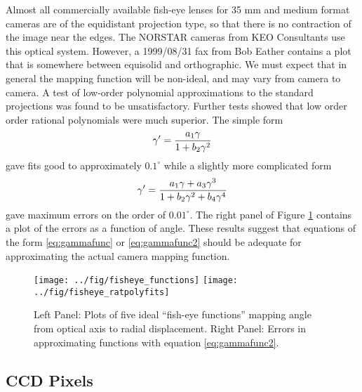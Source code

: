\documentclass[11pt,twoside]{article}   %
\begin{document}
Almost all commercially available fish-eye lenses for 35 mm and
medium format cameras are of the equidistant projection type, so
that there is no contraction of the image near the edges.  The
NORSTAR cameras from KEO Consultants use this optical system.
However, a 1999/08/31 fax from Bob Eather contains a plot that is
somewhere between equisolid and orthographic.  We must expect that
in general the mapping function will be non-ideal, and may vary
from camera to camera.  A test of low-order polynomial
approximations to the standard projections was found to be
unsatisfactory. Further tests showed that low order order rational
polynomials were much superior.  The simple form
 \begin{equation}
   \gamma^\prime = {{a_1 \gamma}\over{1+b_2 \gamma^2 }}
  \label{eq:gammafunc}
 \end{equation}
gave fits good to approximately $0.1^\circ$ while a slightly more
complicated form
 \begin{equation}
   \gamma^\prime = {{a_1 \gamma + a_3 \gamma^3}\over{1+b_2 \gamma^2 + b_4 \gamma^4}}
   \label{eq:gammafunc2}
 \end{equation}
gave maximum errors on the order of $0.01^\circ$.  The right panel
of Figure \ref{fig:fisheyefunctions} contains a plot of the errors
as a function of angle. These results suggest that equations of
the form \ref{eq:gammafunc} or \ref{eq:gammafunc2} should be
adequate for approximating the actual camera mapping function.

\begin{figure}
 \centering
  \texttt{[image: ../fig/fisheye\_functions]}
  \texttt{[image: ../fig/fisheye\_ratpolyfits]}
    \caption[Fish-eye functions]
   {Left Panel: Plots of five ideal ``fish-eye functions'' mapping angle from optical
     axis to radial displacement.  Right Panel: Errors in
     approximating functions with equation \ref{eq:gammafunc2}.
     \label{fig:fisheyefunctions}  }
\end{figure}




%
\subsection{CCD Pixels}
\end{document}
